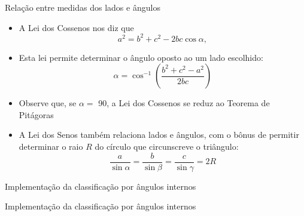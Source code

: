 \begin{frame}[fragile]{Relação entre medidas dos lados e ângulos}

    \begin{itemize}
        \item A Lei dos Cossenos nos diz que
        \[
            a^2 = b^2 + c^2 - 2bc\cos \alpha,
        \]
        
        \item Esta lei permite determinar o ângulo oposto ao um lado escolhido:
        \[
            \alpha = \cos^{-1} \left(\frac{b^2 + c^2 - a^2}{2bc}\right)
        \]
        
        \item Observe que, se $\alpha =$ 90\textdegree, a Lei dos Cossenos se reduz ao 
            Teorema de Pitágoras

        \item A Lei dos Senos também relaciona lados e ângulos, com o bônus de permitir 
            determinar o raio $R$ do círculo que circunscreve o triângulo:
        \[
            \frac{a}{\sin \alpha} = \frac{b}{\sin \beta} = \frac{c}{\sin \gamma} = 2R
        \]
    \end{itemize}

\end{frame}

\begin{frame}[fragile]{Implementação da classificação por ângulos internos}
\end{frame}

\begin{frame}[fragile]{Implementação da classificação por ângulos internos}
\end{frame}

